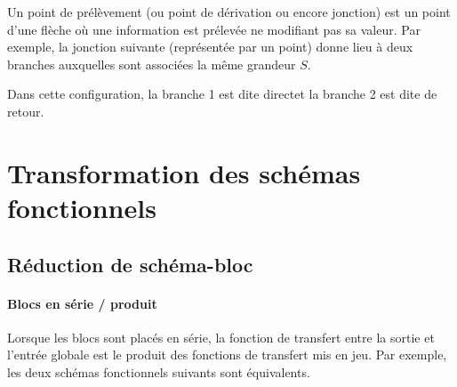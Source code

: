 Un point de prélèvement (ou point de dérivation ou encore jonction) 
est un point d'une flèche où une information est prélevée ne modifiant pas 
sa valeur. Par exemple, la jonction suivante (représentée par un point) donne 
lieu à deux branches auxquelles sont associées la même grandeur $S$.

\begin{center}

\end{center}

Dans cette configuration, la branche 1 est dite \og direct\fg et la 
branche 2 est dite de \og retour\fg.

\section{Transformation des schémas fonctionnels}

\subsection{Réduction de schéma-bloc}

\paragraph{Blocs en série / produit}
Lorsque les blocs sont placés en série, la fonction de transfert 
entre la sortie et l'entrée globale est le produit des fonctions de 
transfert mis en jeu. Par exemple, les deux schémas fonctionnels suivants 
sont équivalents.

